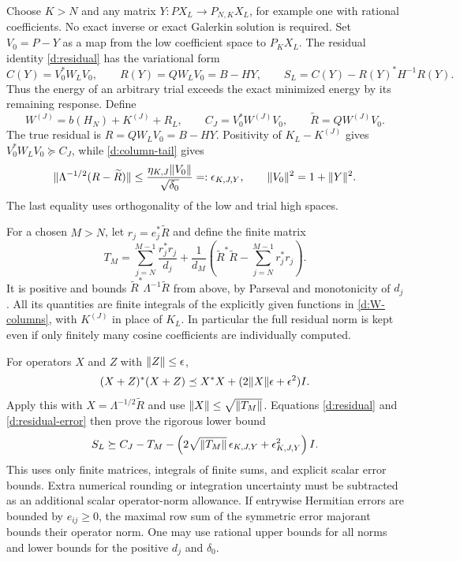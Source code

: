 Choose $K>N$ and any matrix $Y:PX_L\to P_{N,K}X_L$, for example one
with rational coefficients. No exact inverse or exact Galerkin solution
is required. Set $V_0=P-Y$ as a map from the low coefficient space to
$P_KX_L$. The residual identity \eqref{d:residual} has the variational form
\begin{equation}\label{d:variational}
C(Y)=V_0^*W_LV_0,\qquad R(Y)=QW_LV_0=B-HY,\qquad
S_L=C(Y)-R(Y)^*H^{-1}R(Y).
\end{equation}
Thus the energy of an arbitrary trial exceeds the exact minimized energy
by its remaining response. Define
\[
W^{(J)}=b(H_N)+K^{(J)}+R_L,\qquad
C_J=V_0^*W^{(J)}V_0,\qquad\widetilde R=QW^{(J)}V_0.
\]
The true residual is $R=QW_LV_0=B-HY$. Positivity of $K_L-K^{(J)}$
gives $V_0^*W_LV_0\succeq C_J$, while \eqref{d:column-tail} gives
\begin{equation}\label{d:residual-error}
\lVert \Lambda^{-1/2}(R-\widetilde R)\rVert
\le\frac{\eta_{K,J}\lVert V_0\rVert}{\sqrt{\delta_0}}
=:\epsilon_{K,J,Y},\qquad\lVert V_0\rVert^2=1+\lVert Y\rVert^2.
\end{equation}
The last equality uses orthogonality of the low and trial high spaces.

For a chosen $M>N$, let $r_j=e_j^*\widetilde R$ and define the finite
matrix
\begin{equation}\label{d:weighted-tail}
T_M=\sum_{j=N}^{M-1}\frac{r_j^*r_j}{d_j}
+\frac1{d_M}\left(\widetilde R^*\widetilde R-
\sum_{j=N}^{M-1}r_j^*r_j\right).
\end{equation}
It is positive and bounds $\widetilde R^*\Lambda^{-1}\widetilde R$ from
above, by Parseval and monotonicity of $d_j$. All its quantities are finite
integrals of the explicitly given functions in \eqref{d:W-columns}, with
$K^{(J)}$ in place of $K_L$. In particular the full residual norm is kept
even if only finitely many cosine coefficients are individually computed.

For operators $X$ and $Z$ with $\lVert Z\rVert\le\epsilon$,
\[
(X+Z)^*(X+Z)\preceq X^*X+(2\lVert X\rVert\epsilon+\epsilon^2)I.
\]
Apply this with $X=\Lambda^{-1/2}\widetilde R$ and use
$\lVert X\rVert\le\sqrt{\lVert T_M\rVert}$. Equations \eqref{d:residual} and
\eqref{d:residual-error} then prove the rigorous lower bound
\begin{equation}\label{d:finite-certificate}
S_L\succeq C_J-T_M-
\left(2\sqrt{\lVert T_M\rVert}\,\epsilon_{K,J,Y}
+\epsilon_{K,J,Y}^2\right)I.
\end{equation}
This uses only finite matrices, integrals of finite sums, and explicit
scalar error bounds. Extra numerical rounding or integration uncertainty
must be subtracted as an additional scalar operator-norm allowance.
If entrywise Hermitian errors are bounded by $e_{ij}\ge0$, the maximal
row sum of the symmetric error majorant bounds their operator norm.
One may use rational upper bounds for all norms and lower bounds for
the positive $d_j$ and $\delta_0$.

